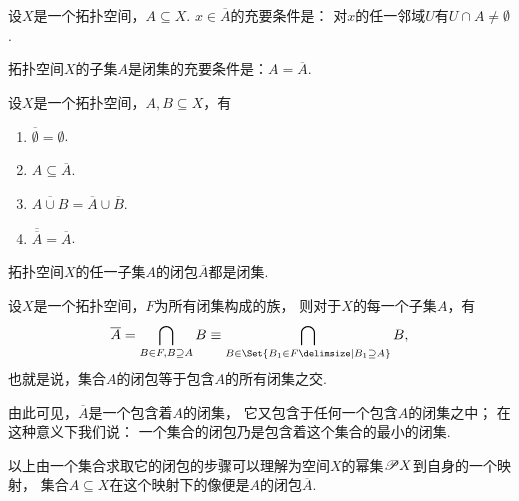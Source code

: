 \begin{property}\label{theorem:拓扑学.一点属于闭包的充要条件}
设\(X\)是一个拓扑空间，\(A \subseteq X\).
\(x \in \overline{A}\)的充要条件是：
对\(x\)的任一邻域\(U\)有\(U \cap A \neq \emptyset\).
\end{property}

\begin{theorem}\label{theorem:拓扑学.成为闭集的充要条件2}
拓扑空间\(X\)的子集\(A\)是闭集的充要条件是：\(A = \overline{A}\).
\end{theorem}

\begin{theorem}\label{theorem:拓扑学.闭包的性质}
设\(X\)是一个拓扑空间，\(A,B \subseteq X\)，有
\begin{enumerate}
	\item \(\overline{\emptyset} = \emptyset\).
	\item \(A \subseteq \overline{A}\).
	\item \(\overline{A \cup B} = \overline{A} \cup \overline{B}\).
	\item \(\overline{\overline{A}} = \overline{A}\).
\end{enumerate}
\end{theorem}

\begin{corollary}\label{theorem:拓扑学.拓扑空间子集闭包都是闭集}
拓扑空间\(X\)的任一子集\(A\)的闭包\(\overline{A}\)都是闭集.
\end{corollary}

\begin{theorem}\label{theorem:拓扑学.集合的闭包是含有该集的最小闭集}
设\(X\)是一个拓扑空间，\(F\)为所有闭集构成的族，
则对于\(X\)的每一个子集\(A\)，有\[
\overline{A}
= \bigcap\limits_{B \in F, B \supseteq A} B
\equiv \bigcap\limits_{B \in \Set{ B_1 \in F \given B_1 \supseteq A}} B,
\]
也就是说，集合\(A\)的闭包等于包含\(A\)的所有闭集之交.
\end{theorem}
由此可见，\(\overline{A}\)是一个包含着\(A\)的闭集，
它又包含于任何一个包含\(A\)的闭集之中；
在这种意义下我们说：
一个集合的闭包乃是包含着这个集合的最小的闭集.

以上由一个集合求取它的闭包的步骤可以理解为空间\(X\)的幂集\(\mathscr{P} X\)到自身的一个映射，
集合\(A \subseteq X\)在这个映射下的像便是\(A\)的闭包\(\overline{A}\).

